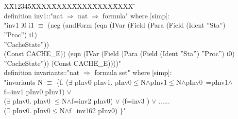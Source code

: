 \documentclass{llncs}
\newlength{\fminilength}
\newenvironment{fmini}[1][\linewidth]
  {\setlength{\fminilength}{#1\fboxsep-2\fboxrule}%
   \vspace{2ex}\noindent\begin{lrbox}{\fminibox}\begin{minipage}{\fminilength}%
   \mbox{ }\hfill\vspace{-2.5ex}}%
  {\end{minipage}\end{lrbox}\vspace{1ex}\hspace{0ex}%
   \framebox{\usebox{\fminibox}}}
\newenvironment{specification}
{\noindent\scriptsize
\tt\begin{fmini}\begin{tabbing}X\=X12345\=XXXX\=XXXX\=XXXX\=XXXX\=XXXX
\=\+\kill} {\end{tabbing}\normalfont\end{fmini}}
\def \pInv {i}
\begin{document}
\begin{specification}\\
definition inv1::"nat $\Rightarrow$ nat $\Rightarrow$ formula" where [simp]:\\
"inv1 \pInv0 \pInv1 $\equiv$
(neg (andForm (eqn (IVar (Field (Para (Field (Ident ''Sta'') ''Proc'') \pInv1)\\ ''CacheState''))\\
 (Const CACHE\_E)) (eqn (IVar (Field (Para (Field (Ident ''Sta'') ''Proc'') \pInv0)\\ ''CacheState'')) (Const CACHE\_E))))"\\
definition invariants::"nat $\Rightarrow$ formula set" where [simp]:\\
"invariants N $\equiv$ \{f.
($\exists$ pInv0 pInv1. pInv0$\le$N$\wedge$pInv1$\le$N$\wedge$pInv0~=pInv1$\wedge$f=inv1  pInv0 pInv1) $\vee$\\
($\exists$ pInv0. pInv0 $\le$N$\wedge$f=inv2  pInv0) $\vee$
(f=inv3  ) $\vee$ ......\\
($\exists$ pInv0. pInv0$\le$N$\wedge$f=inv162  pInv0) \}"\\
\end{specification}\\
\end{document}
